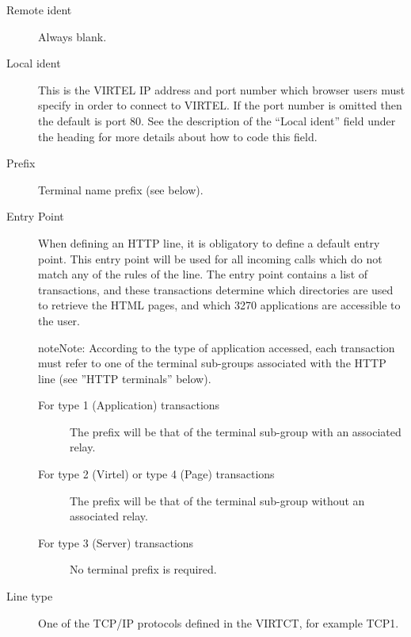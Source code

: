 \documentclass[letterpaper,10pt,english]{sphinxmanual}
\begin{document}

\begin{description}
\item[{Remote ident}] \leavevmode
Always blank.

\item[{Local ident}] \leavevmode
This is the VIRTEL IP address and port number which browser users must specify in order to connect to VIRTEL. If the port number is omitted then the default is port 80. See the description of the
“Local ident” field under the heading {\hyperref[\detokenize{connectivity_guide:bookmark13}]{}} for more details about how to code this field.

\item[{Prefix}] \leavevmode
Terminal name prefix (see below).

\item[{Entry Point}] \leavevmode
When defining an HTTP line, it is obligatory to define a default
entry point. This entry point will be used for all incoming calls
which do not match any of the rules of the line. The entry point
contains a list of transactions, and these transactions determine which directories are used to retrieve
the HTML pages, and which 3270 applications are accessible to the
user.

\begin{sphinxadmonition}{note}{Note:}
According to the type of application accessed, each transaction must
refer to one of the terminal sub-groups associated with the HTTP
line (see ”HTTP terminals” below).
\end{sphinxadmonition}
\begin{description}
\item[{For type 1 (Application) transactions}] \leavevmode
The prefix will be that of the terminal sub-group with an associated relay.

\item[{For type 2 (Virtel) or type 4 (Page) transactions}] \leavevmode
The prefix will be that of the terminal sub-group without an associated relay.

\item[{For type 3 (Server) transactions}] \leavevmode
No terminal prefix is required.

\end{description}

\item[{Line type}] \leavevmode
One of the TCP/IP protocols defined in the VIRTCT, for example TCP1.


\end{description}
\end{document}
